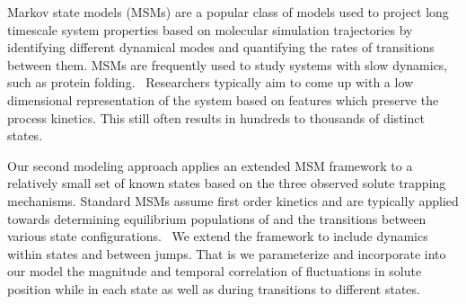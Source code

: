 \documentclass{article}
\begin{document}

  Markov state models (MSMs) are a popular class of models used to project long timescale
  system properties based on molecular simulation trajectories by identifying
  different dynamical modes and quantifying the rates of transitions between them.
  MSMs are frequently used to study systems with slow dynamics, such as protein 
  folding.~\cite{snow_how_2005,chodera_automatic_2007} Researchers typically aim to 
  come up with a low dimensional representation of the system based on features 
  which preserve the process kinetics. This still often results in hundreds to thousands
  of distinct states.~\cite{chodera_markov_2014}

  Our second modeling approach applies an extended MSM framework to a relatively 
  small set of known states based on the three observed solute trapping mechanisms.
  Standard MSMs assume first order kinetics and are typically applied 
  towards determining equilibrium populations of and the transitions between 
  various state configurations.~\cite{bowman_using_2009} 
  We extend the framework
  to include dynamics within states and between jumps. 
  That is we parameterize 
  and incorporate into our model the magnitude and temporal correlation of
  fluctuations in solute position while in each state as well as during transitions
  to different states. 
  
\end{document}
